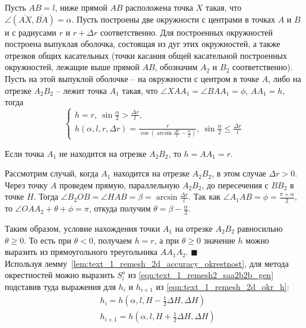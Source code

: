\begin{lemma}\label{lem:text_1_remesh_2d_accuracy_okrestnost}
Пусть $AB = l$, ниже прямой $AB$ расположена точка $X$ такая, что $\angle (\overline{AX}, \overline{BA}) = \alpha$.
Пусть построены две окружности с центрами в точках $A$ и $B$ и с радиусами $r$ и $r + \Delta r$ соответственно.
Для построенных окружностей построена выпуклая оболочка, состоящая из дуг этих окружностей, а также отрезков общих касательных (точки касания общей касательной построенных окружностей, лежащие выше прямой $AB$, обозначим $A_2$ и $B_2$ соответственно).
Пусть на этой выпуклой оболочке -- на окружности с центром в точке $A$, либо на отрезке $A_2B_2$ -- лежит точка $A_1$ такая, что $\angle XAA_1 = \angle BAA_1 = \phi$, $AA_1 = h$, тогда 
\begin{equation}
	\begin{cases}\label{eqn:text_1_remesh_2d_okr_h}
		h = r, \  \sin \frac{\alpha}{2} > \frac{\Delta r}{l}, \\
		h(\alpha, l, r, \Delta r) = \frac{r}{\cos \left( \arcsin \frac{\Delta r}{l} - \frac{\alpha}{2} \right)}, \  \sin \frac{\alpha}{2} \le \frac{\Delta r}{l}
	\end{cases}
\end{equation}
\end{lemma}

Если точка $A_1$ не находится на отрезке $A_2B_2$, то $h = AA_1 = r$.

Рассмотрим случай, когда $A_1$ находится на отрезке $A_2B_2$, в этом случае $\Delta r > 0$.
Через точку $A$ проведем прямую, параллельную $A_2B_2$, до пересечения с $BB_2$ в точке $H$.
Тогда $\angle B_2OB = \angle HAB = \beta = \arcsin \frac{\Delta r}{l}$.
Так как $\angle A_1AB = \phi = \frac{\pi + \alpha}{2}$, то $\angle OAA_2 + \theta + \phi = \pi$, откуда получим $\theta = \beta - \frac{\alpha}{2}$.

Таким образом, условие нахождения точки $A_1$ на отрезке $A_2B_2$ равносильно $\theta \ge 0$.
То есть при $\theta < 0$, получаем $h = r$, а при $\theta \ge 0$ значение $h$ можно выразить из прямоугольного треугольника $AA_1A_2$.
$\blacksquare$\\

Используя лемму~\ref{lem:text_1_remesh_2d_accuracy_okrestnost}, для метода окрестностей можно выразить $S_i^o$ из \eqref{eqn:text_1_remesh2_saa2b2b_gen} подставив туда выражения для $h_i$ и $h_{i + 1}$ из \eqref{eqn:text_1_remesh_2d_okr_h}:
\begin{equation}
	\begin{aligned}
	& h_i = h \left( \alpha, l, H - \frac{1}{2}\Delta H, \Delta H \right) \\
	& h_{i + 1} = h \left( \alpha, l, H + \frac{1}{2}\Delta H, \Delta H \right)
	\end{aligned}
\end{equation}

